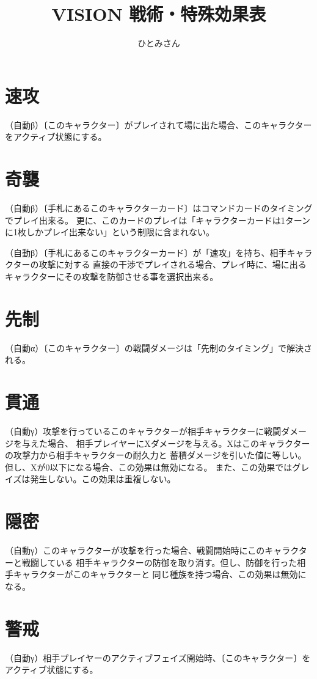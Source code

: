 \documentclass[fontsize=9pt,twocolumn,hanging_punctuation]{jlreq}
\title{VISION 戦術・特殊効果表}
\author{ひとみさん}
\date{\warekitoday}
\newcommand{\↴}{{\fontspec{HackGen}↴}}
\begin{document}
\maketitle

\section*{速攻}
（自動β）〔このキャラクター〕がプレイされて場に出た場合、このキャラクターをアクティブ状態にする。

\section*{奇襲}
（自動β）〔手札にあるこのキャラクターカード〕はコマンドカードのタイミングでプレイ出来る。
更に、このカードのプレイは「キャラクターカードは1ターンに1枚しかプレイ出来ない」という制限に含まれない。

（自動β）〔手札にあるこのキャラクターカード〕が「速攻」を持ち、相手キャラクターの攻撃に対する
直接の干渉でプレイされる場合、プレイ時に、場に出るキャラクターにその攻撃を防御させる事を選択出来る。

\section*{先制}
（自動α）〔このキャラクター〕の戦闘ダメージは「先制のタイミング」で解決される。

\section*{貫通}
（自動γ）攻撃を行っているこのキャラクターが相手キャラクターに戦闘ダメージを与えた場合、
相手プレイヤーにXダメージを与える。Xはこのキャラクターの攻撃力から相手キャラクターの耐久力と
蓄積ダメージを引いた値に等しい。但し、Xが0以下になる場合、この効果は無効になる。
また、この効果ではグレイズは発生しない。この効果は重複しない。

\section*{隠密}
（自動γ）このキャラクターが攻撃を行った場合、戦闘開始時にこのキャラクターと戦闘している
相手キャラクターの防御を取り消す。但し、防御を行った相手キャラクターがこのキャラクターと
同じ種族を持つ場合、この効果は無効になる。

\pagebreak
\section*{警戒}
（自動γ）相手プレイヤーのアクティブフェイズ開始時、〔このキャラクター〕をアクティブ状態にする。
\end{document}
